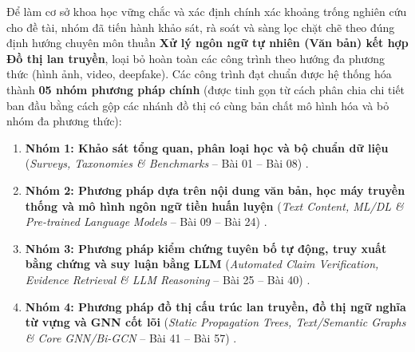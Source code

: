 \documentclass[11pt,a4paper]{extreport}
\begin{document}
Để làm cơ sở khoa học vững chắc và xác định chính xác khoảng trống nghiên cứu cho đề tài, nhóm đã tiến hành khảo sát, rà soát và sàng lọc chặt chẽ theo đúng định hướng chuyên môn thuần \textbf{Xử lý ngôn ngữ tự nhiên (Văn bản) kết hợp Đồ thị lan truyền}, loại bỏ hoàn toàn các công trình theo hướng đa phương thức (hình ảnh, video, deepfake). Các công trình đạt chuẩn được hệ thống hóa thành \textbf{05 nhóm phương pháp chính} (được tinh gọn từ cách phân chia chi tiết ban đầu bằng cách gộp các nhánh đồ thị có cùng bản chất mô hình hóa và bỏ nhóm đa phương thức):
\begin{enumerate}[itemsep=2pt, topsep=2pt, parsep=0pt, leftmargin=1.0cm]
    \item \textbf{Nhóm 1: Khảo sát tổng quan, phân loại học và bộ chuẩn dữ liệu} (\textit{Surveys, Taxonomies \& Benchmarks} -- Bài 01 -- Bài 08) \cite{noauthor_fake_2023, noauthor_comprehensive_2024, noauthor_disinformation_2024, noauthor_fake_2024, noauthor_detection_2025, noauthor_disinformation_2025, noauthor_rethink_2025, noauthor_systematic_2025}.
    \item \textbf{Nhóm 2: Phương pháp dựa trên nội dung văn bản, học máy truyền thống và mô hình ngôn ngữ tiền huấn luyện} (\textit{Text Content, ML/DL \& Pre-trained Language Models} -- Bài 09 -- Bài 24) \cite{noauthor_emotion-enriched_2023, noauthor_fake_2023-1, noauthor_soft-label_2023, noauthor_eu_2024, noauthor_mide22_2024, noauthor_multi-faceted_2024, noauthor_towards_2024, noauthor_addressing_2025, noauthor_dres_2025, noauthor_enhanced_2025, noauthor_fake_2025, noauthor_hybrid_2025, noauthor_misinformation_2025, noauthor_simple_2025, noauthor_unlp_2025, noauthor_use_2025}.
    \item \textbf{Nhóm 3: Phương pháp kiểm chứng tuyên bố tự động, truy xuất bằng chứng và suy luận bằng LLM} (\textit{Automated Claim Verification, Evidence Retrieval \& LLM Reasoning} -- Bài 25 -- Bài 40) \cite{noauthor_beyond_2023, noauthor_chaos_2023, noauthor_enhancing_2023, noauthor_multilingual_2023, noauthor_rumor_2023, noauthor_wsdms_2023, noauthor_ambifc_2024, noauthor_complex_2024, noauthor_infact_2024, noauthor_maple_2024, noauthor_rag-fusion_2024, noauthor_claimcheck_2025, noauthor_cross-domain_2025, noauthor_llm-based_2025, noauthor_pcot_2025, noauthor_quantifying_2025}.
    \item \textbf{Nhóm 4: Phương pháp đồ thị cấu trúc lan truyền, đồ thị ngữ nghĩa từ vựng và GNN cốt lõi} (\textit{Static Propagation Trees, Text/Semantic Graphs \& Core GNN/Bi-GCN} -- Bài 41 -- Bài 57) \cite{ma_detect_2017, wei_towards_2021, noauthor_detecting_2023, noauthor_comparative_2024, noauthor_ensemble_2024, noauthor_exploiting_2024, noauthor_rpf-gcns_2024, noauthor_rumor_2024, noauthor_rumor_2024-1, noauthor_rumor_2024-2, noauthor_early_2025, noauthor_enhancing_2025, noauthor_integrating_2025, qin_ragat-mind_2025, yan_enhancing_2025, cui_avoiding_2026, yan_trgcn_2026}.

\end{enumerate}
\end{document}
